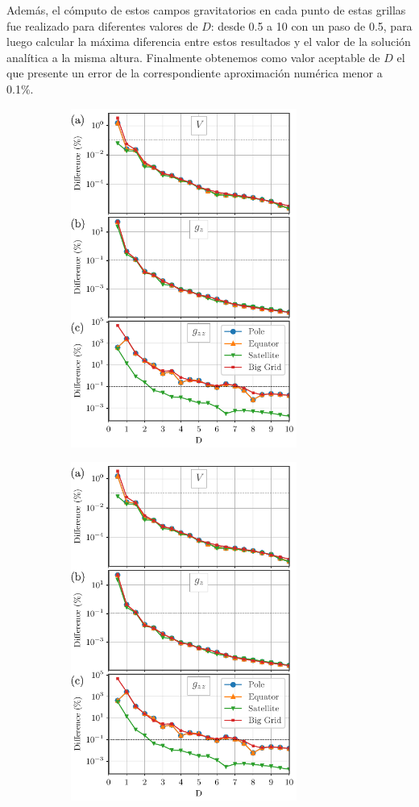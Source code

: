 \documentclass[a4paper,10pt]{article}
\begin{document}
Además, el cómputo de estos campos gravitatorios en cada punto de estas grillas fue realizado para diferentes valores de $D$: desde 0.5 a 10 con un paso de 0.5, para luego calcular la máxima diferencia entre estos resultados y el valor de la solución analítica a la misma altura.
Finalmente obtenemos como valor aceptable de $D$ el que presente un error de la correspondiente aproximación numérica menor a 0.1\%.

\begin{figure}[b!]
    \begin{subfigure}[t]{0.5\textwidth}
    \centering
    \includegraphics[height=30em]{../manuscript/figures/Dlinear-thin-differences.pdf}
    \caption{}
    \label{fig:D-linear-thin}
    \end{subfigure}
    \quad
    \begin{subfigure}[t]{0.5\textwidth}
    \centering
    \includegraphics[height=30em]{../manuscript/figures/Dexp-shifted-thin-differences.pdf}

\end{subfigure}
\end{figure}
\end{document}

